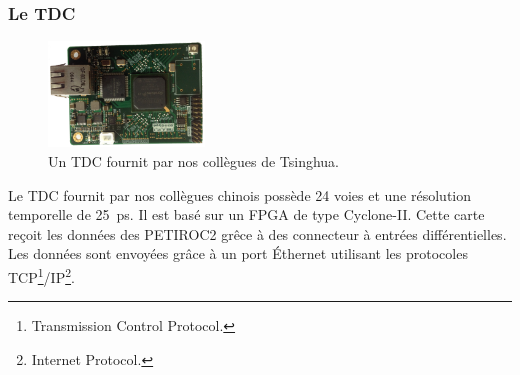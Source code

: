 \subsubsection{Le TDC}
\begin{figure}
	\vspace*{-1cm}
	\centering
	\includegraphics[width=0.37\textwidth]{ELE/TDC.png}
	\caption{Un TDC fournit par nos collègues de Tsinghua.}
	\label{tdc}
\end{figure}
Le TDC fournit par nos collègues chinois possède \num{24} voies et une résolution temporelle de \SI{25}{\pico\second}. Il est basé sur un FPGA de type Cyclone-II. Cette carte reçoit les données des PETIROC2 grêce à des connecteur à entrées différentielles. Les données sont envoyées grâce à un port Éthernet utilisant les protocoles TCP\footnote{Transmission Control Protocol.}/IP\footnote{Internet Protocol.}.